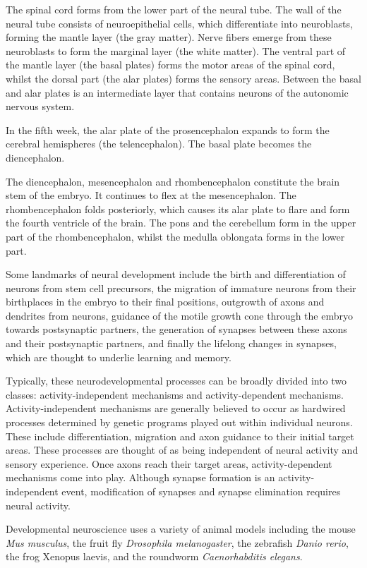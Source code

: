 \documentclass[]{book}
\begin{document}
The spinal cord forms from the lower part of the neural tube. The wall of the neural tube consists of neuroepithelial cells, which differentiate into neuroblasts, forming the mantle layer (the gray matter). Nerve fibers emerge from these neuroblasts to form the marginal layer (the white matter). The ventral part of the mantle layer (the basal plates) forms the motor areas of the spinal cord, whilst the dorsal part (the alar plates) forms the sensory areas. Between the basal and alar plates is an intermediate layer that contains neurons of the autonomic nervous system.

In the fifth week, the alar plate of the prosencephalon expands to form the cerebral hemispheres (the telencephalon). The basal plate becomes the diencephalon.

The diencephalon, mesencephalon and rhombencephalon constitute the brain stem of the embryo. It continues to flex at the mesencephalon. The rhombencephalon folds posteriorly, which causes its alar plate to flare and form the fourth ventricle of the brain. The pons and the cerebellum form in the upper part of the rhombencephalon, whilst the medulla oblongata forms in the lower part.

Some landmarks of neural development include the birth and differentiation of neurons from stem cell precursors, the migration of immature neurons from their birthplaces in the embryo to their final positions, outgrowth of axons and dendrites from neurons, guidance of the motile growth cone through the embryo towards postsynaptic partners, the generation of synapses between these axons and their postsynaptic partners, and finally the lifelong changes in synapses, which are thought to underlie learning and memory.

Typically, these neurodevelopmental processes can be broadly divided into two classes: activity-independent mechanisms and activity-dependent mechanisms. Activity-independent mechanisms are generally believed to occur as hardwired processes determined by genetic programs played out within individual neurons. These include differentiation, migration and axon guidance to their initial target areas. These processes are thought of as being independent of neural activity and sensory experience. Once axons reach their target areas, activity-dependent mechanisms come into play. Although synapse formation is an activity-independent event, modification of synapses and synapse elimination requires neural activity.

Developmental neuroscience uses a variety of animal models including the mouse \emph{Mus musculus}, the fruit fly \emph{Drosophila melanogaster}, the zebrafish \emph{Danio rerio}, the frog Xenopus laevis, and the roundworm \emph{Caenorhabditis elegans}.
\end{document}
